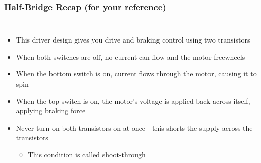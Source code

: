 \documentclass{beamer}
\begin{document}
\begin{frame}
\frametitle{Half-Bridge Recap \small (for your reference)}
\begin{columns}[t]
\begin{itemize}
  \item This driver design gives you drive and braking control using two transistors
  \item<2-> When both switches are off, no current can flow and the motor freewheels
  \item<3-> When the bottom switch is on, current flows through the motor, causing it to spin
  \item<4-> When the top switch is on, the motor's voltage is applied back across itself, applying braking force
  \item<5-> Never turn on both transistors on at once - this shorts the supply across the transistors
  \begin{itemize}
    \item<5-> This condition is called shoot-through
  \end{itemize}
\end{itemize}


\end{columns}
\end{frame}
\end{document}
